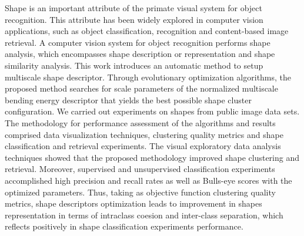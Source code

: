 \begin{comment}
 Shape is an important atribute of the primate visual system for object recognition. This atribute has been widely explored in computer vision applications, such as object classification, recognition and content-based image retrieval. A computer vision system for object recognition performs shape analysis, which encompasses shape description or representation and shape similarity analysis. In this work, we investigate the use of information theory concepts in shape analysis and thus, we propose a new methodology for shape analysis which relies on the multiscale bending energy and the concept of differential entropy. We also apply divergence measures to evaluate shapes similarity based on histograms of its contour signatures.
Moreover, we introduced an evolutionary optimization methodology for parameter adjustment of multiscale shape descriptors. 
We carried out experiments on shapes from public image data sets. The methodology for performance assessment of the algorithms and results comprised data visualization techniques, clustering quality evaluation measures and shape classification and retrieval experiments. 
The visual exploratory data analysis techniques showed that the proposed methodology for parameter adjustment of shape descriptors  improved shape clustering and retrieval. Moreover, unsupervised classification experiments accomplished high Precision and Recall rates as well as Bulls-eye scores with the optimized parameters.  Finally, the results led us to conclude that information theory concepts are suitable for shape and similarity analysis. 
\end{comment}


Shape is an important attribute of the primate visual system for object recognition. This attribute has been widely explored in computer vision applications, such as object classification, recognition and content-based image retrieval. A computer vision system for object recognition performs shape analysis, which encompasses shape description or representation and shape similarity analysis. This work introduces an automatic method to setup multiscale shape descriptor. Through evolutionary optimization algorithms, the proposed method searches for scale parameters of the normalized multiscale bending energy descriptor that yields the best possible shape cluster configuration. We carried out experiments on shapes from public image data sets. The methodology for performance assessment of the algorithms and results comprised data visualization techniques, clustering quality metrics and shape classification and retrieval experiments. The visual exploratory data analysis techniques showed that the proposed methodology improved shape clustering and retrieval. Moreover, supervised and unsupervised classification experiments accomplished high precision and recall rates as well as Bulls-eye scores with the optimized parameters. Thus, taking as objective function clustering quality metrics, shape descriptors optimization leads to improvement in shapes representation in terms of intraclass coesion and inter-class separation, which reflects positively in shape classification experiments performance.    

